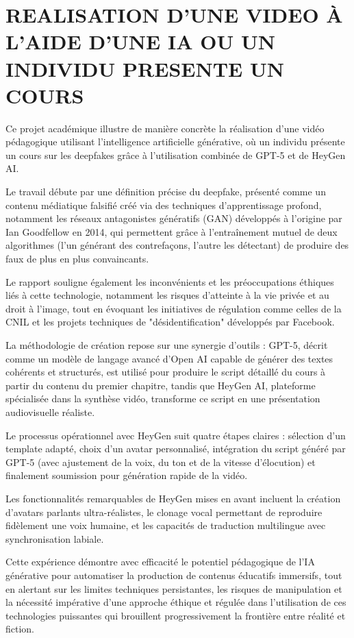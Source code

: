 \documentclass[12pt,a4paper]{article}
\begin{document}
\section{REALISATION D'UNE VIDEO À L'AIDE D'UNE IA OU UN INDIVIDU PRESENTE UN COURS}

Ce projet académique illustre de manière concrète la réalisation d'une vidéo pédagogique utilisant l'intelligence artificielle générative, où un individu présente un cours sur les deepfakes grâce à l'utilisation combinée de GPT-5 et de HeyGen AI. 

Le travail débute par une définition précise du deepfake, présenté comme un contenu médiatique falsifié créé via des techniques d'apprentissage profond, notamment les réseaux antagonistes génératifs (GAN) développés à l'origine par Ian Goodfellow en 2014, qui permettent grâce à l'entraînement mutuel de deux algorithmes (l'un générant des contrefaçons, l'autre les détectant) de produire des faux de plus en plus convaincants. 

Le rapport souligne également les inconvénients et les préoccupations éthiques liés à cette technologie, notamment les risques d'atteinte à la vie privée et au droit à l'image, tout en évoquant les initiatives de régulation comme celles de la CNIL et les projets techniques de "désidentification" développés par Facebook. 

La méthodologie de création repose sur une synergie d'outils : GPT-5, décrit comme un modèle de langage avancé d'Open AI capable de générer des textes cohérents et structurés, est utilisé pour produire le script détaillé du cours à partir du contenu du premier chapitre, tandis que HeyGen AI, plateforme spécialisée dans la synthèse vidéo, transforme ce script en une présentation audiovisuelle réaliste. 

Le processus opérationnel avec HeyGen suit quatre étapes claires : sélection d'un template adapté, choix d'un avatar personnalisé, intégration du script généré par GPT-5 (avec ajustement de la voix, du ton et de la vitesse d'élocution) et finalement soumission pour génération rapide de la vidéo. 

Les fonctionnalités remarquables de HeyGen mises en avant incluent la création d'avatars parlants ultra-réalistes, le clonage vocal permettant de reproduire fidèlement une voix humaine, et les capacités de traduction multilingue avec synchronisation labiale. 

Cette expérience démontre avec efficacité le potentiel pédagogique de l'IA générative pour automatiser la production de contenus éducatifs immersifs, tout en alertant sur les limites techniques persistantes, les risques de manipulation et la nécessité impérative d'une approche éthique et régulée dans l'utilisation de ces technologies puissantes qui brouillent progressivement la frontière entre réalité et fiction.
\end{document}
